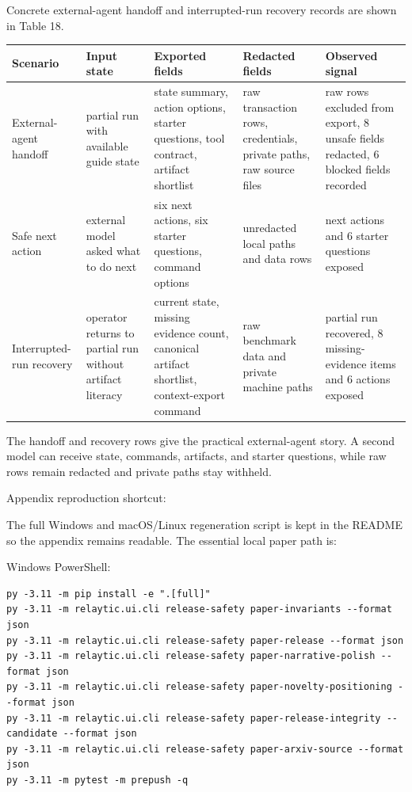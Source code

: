 \documentclass[11pt]{article}
\begin{document}
Concrete external-agent handoff and interrupted-run recovery records are shown in Table 18.

\begin{center}
\begin{minipage}{\linewidth}
\scriptsize
\setlength{\tabcolsep}{3pt}
\renewcommand{\arraystretch}{1.16}
\begin{tabularx}{\linewidth}{@{}>{\raggedright\arraybackslash}X >{\raggedright\arraybackslash}X >{\raggedright\arraybackslash}X >{\raggedright\arraybackslash}X >{\raggedright\arraybackslash}X@{}}
\toprule
Scenario & Input state & Exported fields & Redacted fields & Observed signal \\
\midrule
External-agent handoff & partial run with available guide state & state summary, action options, starter questions, tool contract, artifact shortlist & raw transaction rows, credentials, private paths, raw source files & raw rows excluded from export, 8 unsafe fields redacted, 6 blocked fields recorded \\
Safe next action & external model asked what to do next & six next actions, six starter questions, command options & unredacted local paths and data rows & 6 next actions and 6 starter questions exposed \\
Interrupted-run recovery & operator returns to partial run without artifact literacy & current state, missing evidence count, canonical artifact shortlist, context-export command & raw benchmark data and private machine paths & partial run recovered, 8 missing-evidence items and 6 actions exposed \\
\bottomrule
\end{tabularx}
\end{minipage}
\end{center}


The handoff and recovery rows give the practical external-agent story. A second model can receive state, commands, artifacts, and starter questions, while raw rows remain redacted and private paths stay withheld.

Appendix reproduction shortcut:

The full Windows and macOS/Linux regeneration script is kept in the README so the appendix remains readable. The essential local paper path is:

Windows PowerShell:

\begin{Verbatim}[frame=single,framesep=6pt,fontsize=\footnotesize,breaklines=true,breakanywhere=true]
py -3.11 -m pip install -e ".[full]"
py -3.11 -m relaytic.ui.cli release-safety paper-invariants --format json
py -3.11 -m relaytic.ui.cli release-safety paper-release --format json
py -3.11 -m relaytic.ui.cli release-safety paper-narrative-polish --format json
py -3.11 -m relaytic.ui.cli release-safety paper-novelty-positioning --format json
py -3.11 -m relaytic.ui.cli release-safety paper-release-integrity --candidate --format json
py -3.11 -m relaytic.ui.cli release-safety paper-arxiv-source --format json
py -3.11 -m pytest -m prepush -q
\end{Verbatim}
\end{document}
